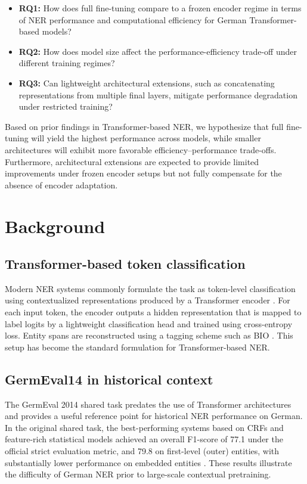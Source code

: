 \documentclass[11pt,a4paper,twocolumn]{article}
\begin{document}
\begin{itemize}
    \item \textbf{RQ1:} How does full fine-tuning compare to a frozen encoder regime in terms of NER performance and computational efficiency for German Transformer-based models?
    \item \textbf{RQ2:} How does model size affect the performance-efficiency trade-off under different training regimes?
    \item \textbf{RQ3:} Can lightweight architectural extensions, such as concatenating representations from multiple final layers, mitigate performance degradation under restricted training?
\end{itemize}

Based on prior findings in Transformer-based NER, we hypothesize that full fine-tuning will yield the highest performance across models, while smaller architectures will exhibit more favorable efficiency--performance trade-offs. Furthermore, architectural extensions are expected to provide limited improvements under frozen encoder setups but not fully compensate for the absence of encoder adaptation.
\section{Background}

\subsection{Transformer-based token classification}
Modern NER systems commonly formulate the task as token-level classification using contextualized representations produced by a Transformer encoder \cite{vaswani_attention_2017}.
For each input token, the encoder outputs a hidden representation that is mapped to label logits by a lightweight classification head and trained using cross-entropy loss.
Entity spans are reconstructed using a tagging scheme such as BIO \cite{tjong_kim_sang_introduction_2003}.
This setup has become the standard formulation for Transformer-based NER.

\subsection{GermEval14 in historical context}
The GermEval 2014 shared task predates the use of Transformer architectures and provides a useful reference point for historical NER performance on German.
In the original shared task, the best-performing systems based on CRFs and feature-rich statistical models achieved an overall F1-score of 77.1 under the official strict evaluation metric, and 79.8 on first-level (outer) entities, with substantially lower performance on embedded entities \cite{benikova_germeval_nodate}.
These results illustrate the difficulty of German NER prior to large-scale contextual pretraining.
\end{document}
